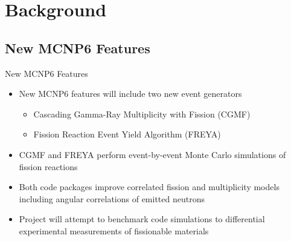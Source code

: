 \documentclass{beamer}
\begin{document}
\section{Background}
\begin{frame}
\sectionpage
\end{frame}

\subsection{New MCNP6 Features}
\begin{frame}{New MCNP6 Features}
\begin{itemize}
\item New MCNP6 features will include two new event generators
\begin{itemize}
\item Cascading Gamma-Ray Multiplicity with Fission (CGMF)
\item Fission Reaction Event Yield Algorithm (FREYA)
\end{itemize}
\item CGMF and FREYA perform event-by-event Monte Carlo simulations of fission reactions
\item Both code packages improve correlated fission and multiplicity models including angular correlations of emitted neutrons
\item Project will attempt to benchmark code simulations to differential experimental measurements of fissionable materials
\end{itemize}
\end{frame}
\end{document}
